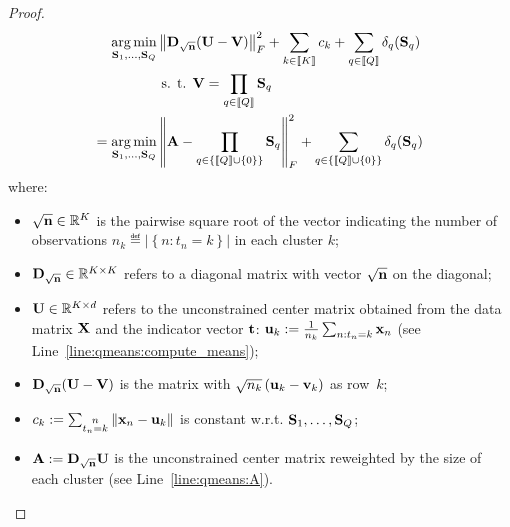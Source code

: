 \begin{proof}
\begin{align}
 \operatorname*{arg\,min}_{{\mathbf{S}}_1, \ldots,{\mathbf{S}}_Q} & \left \| {\mathbf{D}}_{\sqrt{{\mathbf{n}}}} ({\mathbf{U}} - {\mathbf{V}})\right \|_F^2 + \sum_{k\in\left \llbracket K\right \rrbracket} c_k + \sum_{q\in\left \llbracket Q\right \rrbracket} \delta_q({\mathbf{S}}_q) \notag \\
 & \text{ s. t. } {\mathbf{V}} = \prod_{q\in\left \llbracket Q\right \rrbracket}{{\mathbf{S}}_q} \nonumber\\
 = \operatorname*{arg\,min}_{{\mathbf{S}}_1, \ldots,{\mathbf{S}}_Q} & \left \| {\mathbf{A}} - \prod_{q\in\left\{\left \llbracket Q\right \rrbracket \cup \{0\}\right\}}{{\mathbf{S}}_q}\right \|_F^2 + \sum_{q\in\left\{\left \llbracket Q\right \rrbracket \cup \{0\}\right\}} \delta_q({\mathbf{S}}_q) \notag \\
 \label{eq:qmeans_problem_t_fixed}
 \end{align}
%
where:
%
\begin{itemize}
 \item $\sqrt{{\mathbf{n}}} \in \mathbb{R}^{K}$ is the pairwise square root of the vector indicating the number of observations $n_k \eqdef \left | \left \lbrace n: t_n = k\right \rbrace \right |$  in each cluster $k$;
 \item ${\mathbf{D}}_{\sqrt{{\mathbf{n}}}} \in \mathbb{R}^{K \times K}$ refers to a diagonal matrix with vector $\sqrt{{\mathbf{n}}}$ on the diagonal;
 \item ${\mathbf{U}}\in \mathbb{R}^{K \times d}$ refers to the unconstrained center matrix obtained from the data matrix ${\mathbf{X}}$ and the indicator vector ${\mathbf{t}}$: ${\mathbf{u}}_k := \frac{1}{n_k}\sum_{n:t_n = k} {{\mathbf{x}}_n}$ (see Line~\ref{line:qmeans:compute_means});
 \item ${\mathbf{D}}_{\sqrt{{\mathbf{n}}}} ({\mathbf{U}} - {\mathbf{V}})$ is the matrix with $\sqrt{n_k}\left ({\mathbf{u}}_k-{\mathbf{v}}_k\right )$ as row~$k$;
 \item $c_k := \sum_{\substack{n\\t_n = k}}\left \| {\mathbf{x}}_n - {\mathbf{u}}_k\right \|$ is constant w.r.t. $ {\mathbf{S}}_1, \ldots,{\mathbf{S}}_Q$;
 \item ${\mathbf{A}} := {\mathbf{D}}_{\sqrt{{\mathbf{n}}}} {\mathbf{U}}$ is the unconstrained center matrix reweighted by the size of each cluster (see Line~\ref{line:qmeans:A}).
\end{itemize}


\end{proof}
